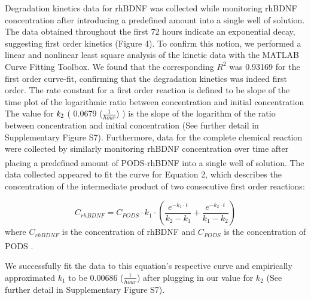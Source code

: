 \documentclass[review]{elsarticle}
\begin{document}
Degradation kinetics data for rhBDNF was collected while monitoring rhBDNF concentration after introducing a predefined amount into a single well of solution. The data obtained throughout the first 72 hours indicate an exponential decay, suggesting first order kinetics (Figure 4). To confirm this notion, we performed a linear and nonlinear least square analysis of the kinetic data with the MATLAB Curve Fitting Toolbox. We found that the corresponding $R^{2}$ was 0.93169 for the first order curve-fit, confirming that the degradation kinetics was indeed first order. The rate constant for a first order reaction is defined to be slope of the time plot of the logarithmic ratio between concentration and initial concentration The value for $k\textsubscript{2}$ ( 0.0679 ($\frac{1}{hour}$) ) is the slope of the logarithm of the ratio between concentration and initial concentration (See further detail in Supplementary Figure S7). Furthermore, data for the complete chemical reaction were collected by similarly monitoring rhBDNF concentration over time after placing a predefined amount of PODS\textsuperscript{\textregistered}-rhBDNF into a single well of solution. The data collected appeared to fit the curve for Equation 2, which describes the concentration of the intermediate product of two consecutive first order reactions:  

\begin{equation}
C_{rhBDNF} =  C_{PODS} \cdot k_1 \cdot (\frac{e^{-k_1 \cdot t}}{ k_2-  k_1}  + \frac{e^{-k_2 \cdot t}}{ k_1 -  k_2} )
\end{equation}
where $C_{rhBDNF}$ is the concentration of rhBDNF and $C_{PODS}$ is the concentration of PODS\textsuperscript{\textregistered} \cite{levenspiel1999}.

 We successfully fit the data to this equation's respective curve and empirically approximated $k_{1}$ to be 0.00686 ($\frac{1}{hour}$) after plugging in our value for $k_{2}$ (See further detail in Supplementary Figure S7).  
 
\end{document}
